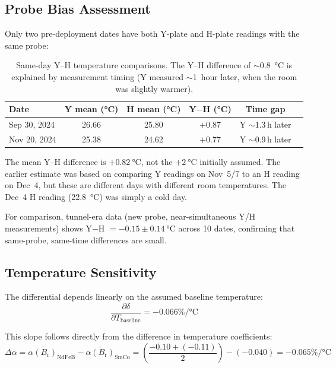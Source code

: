 \documentclass[11pt,letterpaper]{article}
\newcommand{\Br}{B_\mathrm{r}}
\newcommand{\alphar}{\alpha(\Br)}
\begin{document}
\subsection{Probe Bias Assessment}
\label{sec:probe_bias}

Only two pre-deployment dates have both Y-plate and H-plate readings with the
same probe:

\begin{table}[H]
\centering
\caption{Same-day Y--H temperature comparisons. The Y--H difference of
$\sim$\SI{0.8}{\celsius} is explained by measurement timing (Y measured
$\sim$1~hour later, when the room was slightly warmer).}
\label{tab:probe_bias}
\begin{tabular}{@{}lccccc@{}}
\toprule
\textbf{Date} & Y mean (\si{\celsius}) & H mean (\si{\celsius}) & Y$-$H (\si{\celsius}) & Time gap \\
\midrule
Sep 30, 2024 & 26.66 & 25.80 & $+0.87$ & Y $\sim$1.3\,h later \\
Nov 20, 2024 & 25.38 & 24.62 & $+0.77$ & Y $\sim$0.9\,h later \\
\bottomrule
\end{tabular}
\end{table}

The mean Y--H difference is $+\SI{0.82}{\celsius}$, not the $+\SI{2}{\celsius}$
initially assumed. The earlier estimate was based on comparing Y readings on
Nov~5/7 to an H reading on Dec~4, but these are different days with
different room temperatures. The Dec~4 H reading (\SI{22.8}{\celsius}) was
simply a cold day.

For comparison, tunnel-era data (new probe, near-simultaneous Y/H measurements)
shows Y$-$H $= -0.15\pm\SI{0.14}{\celsius}$ across 10 dates, confirming that
same-probe, same-time differences are small.

\subsection{Temperature Sensitivity}
\label{sec:temp_sensitivity}

The differential depends linearly on the assumed baseline temperature:
\begin{equation}
    \frac{\partial \delta}{\partial T_\mathrm{baseline}} = -0.066\%/\si{\celsius}
    \label{eq:temp_sensitivity}
\end{equation}

This slope follows directly from the difference in temperature coefficients:
\begin{equation}
    \Delta\alpha = \overline{\alphar}_\mathrm{NdFeB} - \overline{\alphar}_\mathrm{SmCo}
    = \left(\frac{-0.10 + (-0.11)}{2}\right) - (-0.040)
    = -0.065\%/\si{\celsius}
\end{equation}
\end{document}
